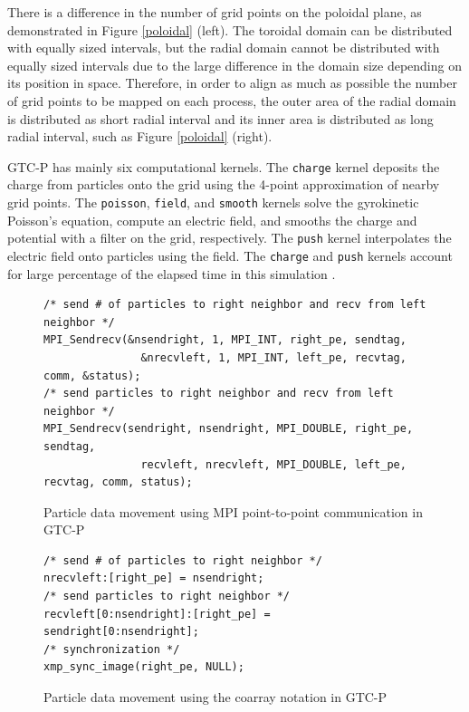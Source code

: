 There is a difference in the number of grid points on the poloidal plane, as demonstrated in Figure \ref{poloidal} (left). The toroidal domain can be distributed with equally sized intervals, but the radial domain cannot be distributed with equally sized intervals due to the large difference in the domain size depending on its position in space. Therefore, in order to align as much as possible the number of grid points to be mapped on each process, the outer area of the radial domain is distributed as short radial interval and its inner area is distributed as long radial interval, such as Figure \ref{poloidal} (right).

GTC-P has mainly six computational kernels. The {\tt charge} kernel deposits the charge from particles onto the grid using the 4-point approximation of nearby grid points. The {\tt poisson}, {\tt field}, and {\tt smooth} kernels solve the gyrokinetic Poisson's equation, compute an electric field, and smooths the charge and potential with a filter on the grid, respectively. The {\tt push} kernel interpolates the electric field onto particles using the field. The {\tt charge} and {\tt push} kernels account for large percentage of the elapsed time in this simulation \cite{GTC-P1}\cite{GTC-P2}.

\begin{figure}[t]
\centering
{\scriptsize
\begin{minipage}{11cm}
\begin{lstlisting}
/* send # of particles to right neighbor and recv from left neighbor */
MPI_Sendrecv(&nsendright, 1, MPI_INT, right_pe, sendtag,
               &nrecvleft, 1, MPI_INT, left_pe, recvtag, comm, &status);
/* send particles to right neighbor and recv from left neighbor */
MPI_Sendrecv(sendright, nsendright, MPI_DOUBLE, right_pe, sendtag, 
               recvleft, nrecvleft, MPI_DOUBLE, left_pe, recvtag, comm, status);
\end{lstlisting}
\end{minipage}
}
\caption{Particle data movement using MPI point-to-point communication in GTC-P}
\label{pmove_mpi}

\bigskip

\centering
{\scriptsize
\begin{minipage}{11cm}
\begin{lstlisting}
/* send # of particles to right neighbor */
nrecvleft:[right_pe] = nsendright;
/* send particles to right neighbor */
recvleft[0:nsendright]:[right_pe] = sendright[0:nsendright];
/* synchronization */
xmp_sync_image(right_pe, NULL);
\end{lstlisting}
\end{minipage}
}
\caption{Particle data movement using the coarray notation in GTC-P\label{pmove_xmp}}
\end{figure}

